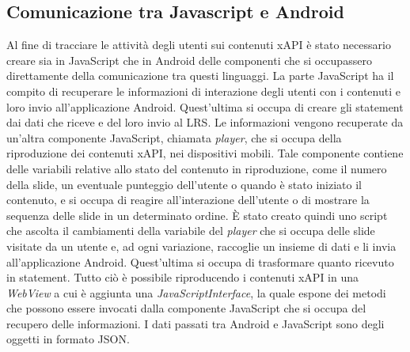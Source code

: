 \documentclass[../Tesi.tex]{subfiles}
\begin{document}
	\subsection{Comunicazione tra Javascript e Android}
	Al fine di tracciare le attività degli utenti sui contenuti xAPI è stato necessario creare sia in JavaScript che in Android delle componenti che si occupassero direttamente della comunicazione tra questi linguaggi. La parte JavaScript ha il compito di recuperare le informazioni di interazione degli utenti con i contenuti e loro invio all'applicazione Android. Quest'ultima si occupa di creare gli statement dai dati che riceve e del loro invio al LRS. Le informazioni vengono recuperate da un'altra componente JavaScript, chiamata \textit{player}, che si occupa della riproduzione dei contenuti xAPI, nei dispositivi mobili. Tale componente contiene delle variabili relative allo stato del contenuto in riproduzione, come il numero della slide, un eventuale punteggio dell'utente o quando è stato iniziato il contenuto, e si occupa di reagire all'interazione dell'utente o di mostrare la sequenza delle slide in un determinato ordine. 
	È stato creato quindi uno script che ascolta il cambiamenti della variabile del \textit{player} che si occupa delle slide visitate da un utente e, ad ogni variazione, raccoglie un insieme di dati e li invia all'applicazione Android. Quest'ultima si occupa di trasformare quanto ricevuto in statement. Tutto ciò è possibile riproducendo i contenuti xAPI in una \textit{WebView} a cui è aggiunta una \textit{JavaScriptInterface}, la quale espone dei metodi che possono essere invocati dalla componente JavaScript che si occupa del recupero delle informazioni. I dati passati tra Android e JavaScript sono degli oggetti in formato JSON.
\end{document}
